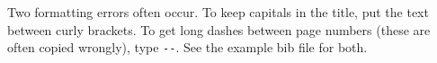 \documentclass[twocolumn, 10pt, a4paper]{article}
\begin{document}
Two formatting errors often occur. To keep capitals in the title, put the text between curly brackets. To get long dashes between page numbers (these are often copied wrongly), type \verb|--|. See the example bib file for both. 



\renewcommand{\bibname}{References} 




\end{document}
